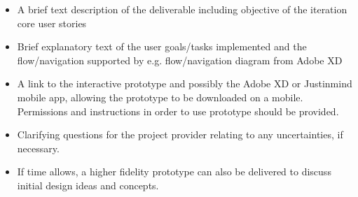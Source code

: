 \documentclass[10pt,a4paper]{article}
\begin{document}
\begin{itemize}

\item A brief text description of the deliverable including objective of the iteration core user stories

\item Brief explanatory text of the user goals/tasks implemented and the flow/navigation supported by e.g. flow/navigation diagram from Adobe XD

\item A link to the interactive prototype and possibly the Adobe XD or Justinmind mobile app, allowing the prototype to be downloaded on a mobile. Permissions and instructions in order to use prototype should be provided.

\item Clarifying questions for the project provider relating to any uncertainties, if necessary.

\item If time allows, a higher fidelity prototype can also be delivered to discuss initial design ideas and concepts.
\end{itemize}
\end{document}
